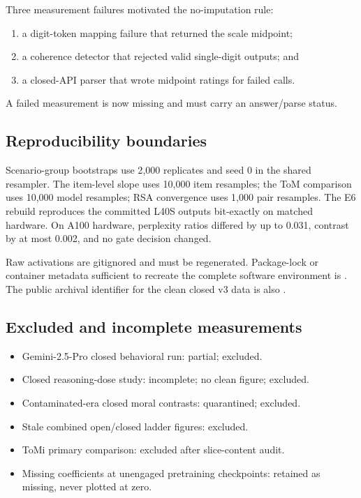 Three measurement failures motivated the no-imputation rule:
\begin{enumerate}[leftmargin=*]
    \item a digit-token mapping failure that returned the scale midpoint;
    \item a coherence detector that rejected valid single-digit outputs; and
    \item a closed-API parser that wrote midpoint ratings for failed calls.
\end{enumerate}
A failed measurement is now missing and must carry an answer/parse status.

\subsection{Reproducibility boundaries}

Scenario-group bootstraps use 2{,}000 replicates and seed 0 in the shared resampler.
The item-level slope uses 10{,}000 item resamples; the ToM comparison uses 10{,}000 model resamples; RSA convergence uses 1{,}000 pair resamples.
The E6 rebuild reproduces the committed L40S outputs bit-exactly on matched hardware.
On A100 hardware, perplexity ratios differed by up to 0.031, contrast by at most 0.002, and no gate decision changed.

Raw activations are gitignored and must be regenerated.
Package-lock or container metadata sufficient to recreate the complete software environment is \missinginfo.
The public archival identifier for the clean closed v3 data is also \missinginfo.

\subsection{Excluded and incomplete measurements}

\begin{itemize}[leftmargin=*]
    \item Gemini-2.5-Pro closed behavioral run: partial; excluded.
    \item Closed reasoning-dose study: incomplete; no clean figure; excluded.
    \item Contaminated-era closed moral contrasts: quarantined; excluded.
    \item Stale combined open/closed ladder figures: excluded.
    \item ToMi primary comparison: excluded after slice-content audit.
    \item Missing coefficients at unengaged pretraining checkpoints: retained as missing, never plotted at zero.
\end{itemize}

